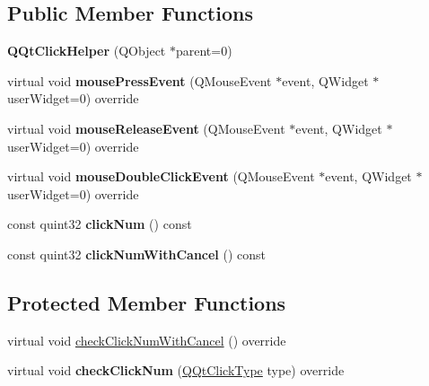 \subsection*{Public Member Functions}
\begin{DoxyCompactItemize}
\item 
\mbox{\label{class_q_qt_click_helper_abe97fa3f6cd15bcd7e2191c8f2670f97}} 
{\bfseries Q\+Qt\+Click\+Helper} (Q\+Object $\ast$parent=0)
\item 
\mbox{\label{class_q_qt_click_helper_a52bdb2aa676186a4af259abaaf659346}} 
virtual void {\bfseries mouse\+Press\+Event} (Q\+Mouse\+Event $\ast$event, Q\+Widget $\ast$user\+Widget=0) override
\item 
\mbox{\label{class_q_qt_click_helper_add356bcf837b60ccb7f6ed5f490df972}} 
virtual void {\bfseries mouse\+Release\+Event} (Q\+Mouse\+Event $\ast$event, Q\+Widget $\ast$user\+Widget=0) override
\item 
\mbox{\label{class_q_qt_click_helper_ad30847a4e7caec2dfa33efd692dec057}} 
virtual void {\bfseries mouse\+Double\+Click\+Event} (Q\+Mouse\+Event $\ast$event, Q\+Widget $\ast$user\+Widget=0) override
\item 
\mbox{\label{class_q_qt_click_helper_aac399f6b4cb0266392728385e050aa0e}} 
const quint32 {\bfseries click\+Num} () const
\item 
\mbox{\label{class_q_qt_click_helper_aba56f64e8f1d2f517bf605de1e715f31}} 
const quint32 {\bfseries click\+Num\+With\+Cancel} () const
\end{DoxyCompactItemize}
\subsection*{Protected Member Functions}
\begin{DoxyCompactItemize}
\item 
virtual void \mbox{\hyperlink{class_q_qt_click_helper_ac66c7a5eccddec8d34fc74afd6a266f7}{check\+Click\+Num\+With\+Cancel}} () override
\item 
\mbox{\label{class_q_qt_click_helper_ab4f56f1adabf46a5bcffd54a5b63715a}} 
virtual void {\bfseries check\+Click\+Num} (\mbox{\hyperlink{class_q_qt_virtual_click_helper_ace6c0c9b072e51f2cb3ff1316404b764}{Q\+Qt\+Click\+Type}} type) override
\end{DoxyCompactItemize}
